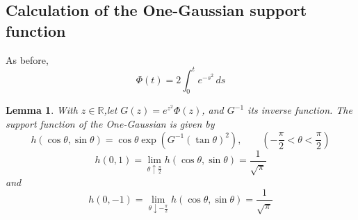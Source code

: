 \documentclass{article}[1100]
\newtheorem{lemma}[theorem]{Lemma}
\theoremstyle{definition}
\theoremstyle{remark}
\newcommand\ar{\mathbb{R}}
\begin{document}
\subsection{Calculation of the One-Gaussian support function}
As before, 
\[ \Phi(t)=2\int_{0}^te^{-s^2}\,ds\]
\begin{tcolorbox}
\begin{lemma}\label{oneGaussianSupportFunction}
With $z\in\ar$,let  $G(z)=e^{z^2}\Phi(z)$, and $G^{-1}$ its inverse function. The support function of the One-Gaussian is given by
\begin{equation}\label{eq:oneGaussianSupportFunction1}
h(\cos\theta,\sin\theta)=\cos\theta\exp(G^{-1}(\tan\theta)^2),\qquad (-\frac{\pi}{2}<\theta<\frac{\pi}{2})
\end{equation}
\[ h(0,1)=\lim_{\theta\uparrow\frac{\pi}{2}}h(\cos\theta,\sin\theta)=\frac{1}{\sqrt{\pi}}\]
and
\[ h(0,-1)=\lim_{\theta\downarrow -\frac{\pi}{2}}h(\cos\theta,\sin\theta)=\frac{1}{\sqrt{\pi}}\]
\end{lemma}
\end{tcolorbox}
\end{document}

